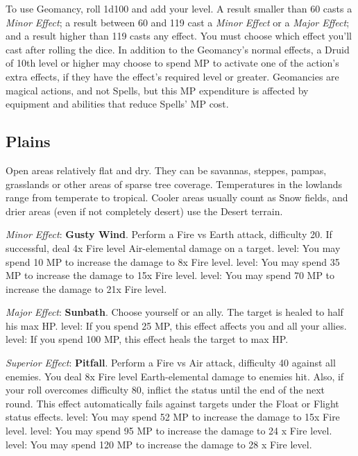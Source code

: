 To use Geomancy, roll 1d100 and add your level. A result smaller than 60 casts a \textit{Minor Effect}; a result between 60 and 119 cast a \textit{Minor Effect} or a \textit{Major Effect}; and a result higher than 119 casts any effect.  You must choose which effect you'll cast after rolling the dice. In addition to the Geomancy’s normal  effects, a Druid of 10th level or higher may choose to spend MP to activate one of the action’s extra effects,  if they have the effect’s required level or greater. Geomancies are magical actions, and not Spells, but this  MP expenditure is affected by equipment and abilities that reduce Spells’ MP cost.

\begin{multicols}{2}
\subsection*{Plains}\label{subsec:geo-plains}
	
Open areas relatively flat and dry. They can be savannas, steppes, pampas, grasslands or other areas of sparse tree coverage. Temperatures in the  lowlands range from temperate to tropical. Cooler  areas usually count as Snow fields, and drier areas  (even if not completely desert) use the Desert  terrain.

\textit{Minor Effect}: \textbf{Gusty Wind}. Perform a Fire vs Earth attack, difficulty 20. If successful, deal 4x Fire level Air-elemental damage on a target.  level: You may spend 10 MP to increase the damage to 8x Fire level.  level: You may spend 35 MP to increase the damage to 15x Fire level.  level: You may spend 70 MP to increase the damage to 21x Fire level.

\textit{Major Effect}: \textbf{Sunbath}. Choose yourself or an ally. The target is healed to half his max HP\@.  level: If you spend 25 MP, this effect affects you and all your allies.  level: If you spend 100 MP, this effect heals the target to max HP\@. %

\textit{Superior Effect}: \textbf{Pitfall}. Perform a Fire vs Air attack, difficulty 40 against all enemies. You deal 8x Fire level Earth-elemental damage to enemies hit. Also, if your roll overcomes difficulty 80, inflict the  status until the end of the next round. This effect automatically fails against targets under the Float or Flight status effects.  level: You may spend 52 MP to increase the damage to 15x Fire level.  level: You may spend 95 MP to increase the damage to 24 x Fire level.  level: You may spend 120 MP to increase the damage to 28 x Fire level.


\end{multicols}
